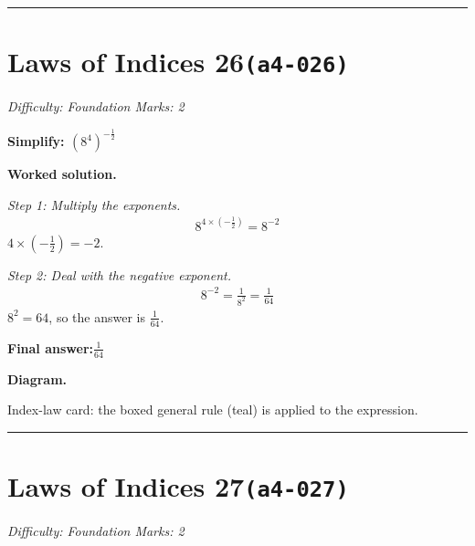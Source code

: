 \documentclass[11pt]{article}
\newcommand{\question}[1]{\par\medskip\noindent\textbf{#1}\par}
\begin{document}
\medskip\hrule

\section*{Laws of Indices 26\quad\small\texttt{(a4-026)}}
\textit{Difficulty: Foundation \quad\textbar\quad Marks: 2}

\question{Simplify: \( (8^4)^{-\frac{1}{2}} \)}

\textbf{Worked solution.}

\textit{Step 1: Multiply the exponents.}
\[\begin{gathered}
8^{4 \times (-\frac{1}{2})} = 8^{-2}
\end{gathered}\]
\( 4 \times (-\frac{1}{2}) = -2 \).

\textit{Step 2: Deal with the negative exponent.}
\[\begin{gathered}
8^{-2} = \frac{1}{8^2} = \frac{1}{64}
\end{gathered}\]
\( 8^2 = 64 \), so the answer is \( \frac{1}{64} \).

\begin{answerbox}
\textbf{Final answer:}\quad \(\displaystyle \frac{1}{64}\)
\end{answerbox}
\textbf{Diagram.}

\begin{center}
\end{center}
\small Index-law card: the boxed general rule (teal) is applied to the expression.\normalsize

\medskip\hrule

\section*{Laws of Indices 27\quad\small\texttt{(a4-027)}}
\textit{Difficulty: Foundation \quad\textbar\quad Marks: 2}
\end{document}
